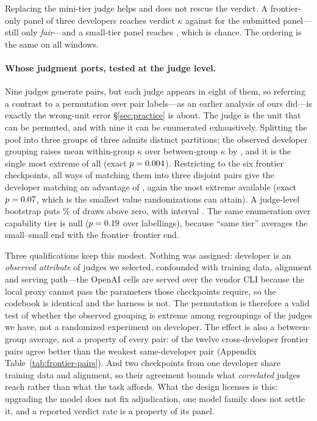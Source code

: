\documentclass[11pt]{article}
\begin{document}
\noindent Replacing the mini-tier judge helps and does not rescue the verdict. A
frontier-only panel of three developers reaches verdict $\kappa$
\TierFrontierVerdictK{} against \TierSubmittedVerdictK{} for the submitted
panel---still only \emph{fair}---and a small-tier panel reaches
\TierSmallVerdictK{}, which is chance. The ordering is the same on all
\TierAllItems{} windows.

\paragraph{Whose judgment ports, tested at the judge level.}
Nine judges generate \TierNPairs{} pairs, but each judge appears in eight of
them, so referring a contrast to a permutation over pair labels---as an earlier
analysis of ours did---is exactly the wrong-unit error \S\ref{sec:practice} is
about. The judge is the unit that can be permuted, and with nine it can be
enumerated exhaustively. Splitting the pool into three groups of three admits
\TierDevRand{} distinct partitions; the observed developer grouping raises mean
within-group $\kappa$ over between-group $\kappa$ by \TierDevDiff{}, and it is
the single most extreme of all \TierDevRand{} (exact $p=0.004$). Restricting
to the six frontier checkpoints, all \TierPairRand{} ways of matching them into
three disjoint pairs give the developer matching an advantage of
\TierPairDiff{}, again the most extreme available (exact $p=0.07$, which
is the smallest value \TierPairRand{} randomizations can attain). A judge-level
bootstrap puts \TierDevBootShare\% of draws above zero, with interval
\TierDevBootCI{}. The same enumeration over capability tier is null
($p=0.19$ over \TierTierRand{} labellings), because ``same tier'' averages
the small--small end with the frontier--frontier end.

\noindent Three qualifications keep this modest. Nothing was assigned: developer
is an \emph{observed attribute} of judges we selected, confounded with training
data, alignment and serving path---the OpenAI cells are served over the vendor
CLI because the local proxy cannot pass the parameters those checkpoints
require, so the codebook is identical and the harness is not. The permutation is
therefore a valid test of whether the observed grouping is extreme among
regroupings of the judges we have, not a randomized experiment on developer. The
effect is also a between-group average, not a property of every pair:
\TierFrontCrossBeats{} of the twelve cross-developer frontier pairs agree better
than the weakest same-developer pair (Appendix
Table~\ref{tab:frontier-pairs}). And two checkpoints from one developer share
training data and alignment, so their agreement bounds what \emph{correlated}
judges reach rather than what the task affords. What the design licenses is
this: upgrading the model does not fix adjudication, one model family does not
settle it, and a reported verdict rate is a property of its panel.
\end{document}

